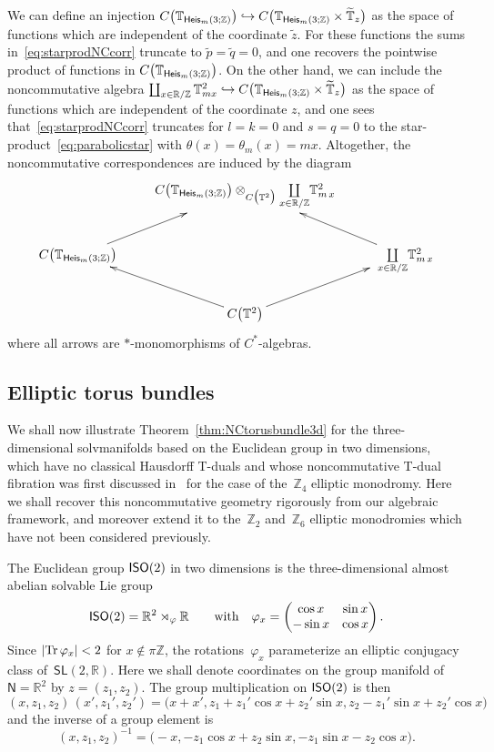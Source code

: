\documentclass[pdftex]{sigma}
\numberwithin{equation}{section}
\newcommand{\Z}{\zed}
\newcommand{\sfN}{\mathsf{N}}
\newcommand{\sfSL}{\mathsf{SL}}
\newcommand{\Heis}{{\sf Heis}}
\newcommand{\ISO}{{\sf ISO}}
\newcommand{\mcoprod}{\mbox{$\coprod\limits_{x\in\R/\Z}$}}
\newcommand{\R}{\real}
\newcommand{\zed}{{\mathbb Z}} %
\newcommand{\real}{{\mathbb R}} %
\newcommand{\torus}{{\mathbb T}} %
\newcommand{\Tr}[1]{{\rm Tr}\,#1}
\begin{document}
We can define an injection $C\big(\torus_{\Heis_m(3;\Z)}\big)\hookrightarrow
C\big(\torus_{\Heis_m(3;\Z)}\times\widetilde\torus_z\big)$ as the space of
functions which are independent of the coordinate $\tilde z$. For
these functions the sums in~\eqref{eq:starprodNCcorr} truncate to
$\tilde p=\tilde q=0$, and one recovers the pointwise product of
functions in $C\big(\torus_{\Heis_m(3;\Z)}\big)$. On the other hand, we can include the
noncommutative algebra $\coprod_{x\in\R/\Z} \torus_{m x}^2 \hookrightarrow
C\big(\torus_{\Heis_m(3;\Z)}\times\widetilde\torus_z\big)$ as the space of
functions which are independent of the coordinate $z$, and one sees
that~\eqref{eq:starprodNCcorr} truncates for $l=k=0$ and $s=q=0$ to the star-product~\eqref{eq:parabolicstar} with $\theta(x)=\theta_m(x)=m x$. Altogether, the noncommutative correspondences are
induced by the diagram
\[
\xymatrix{
& C\big(\torus_{\Heis_m(3;\Z)}\big)\otimes_{C\big(\torus^2\big)} \mcoprod \torus_{m\,x}^2 & \\
C\big(\torus_{\Heis_m(3;\Z)}\big) \ar[ur]& &
 \ \mcoprod \torus_{m\,x}^2
\ar[ul] \\
 & C\big(\torus^2\big) \ar[ur]
 \ar[ul] &
}
\]
where all arrows are $*$-monomorphisms of $C^*$-algebras.

\subsection{Elliptic torus bundles}\label{sec:ellipticbundles}

We shall now illustrate Theorem~\ref{thm:NCtorusbundle3d} for the three-dimensional solvmanifolds
based on the Euclidean group in two dimensions, which have no
classical Hausdorff T-duals and whose noncommutative T-dual fibration was first
discussed in~\cite{Hull2019} for the case of the~$\Z_4$ elliptic
monodromy. Here we shall recover this noncommutative geometry rigorously from
our algebraic framework, and moreover extend it to the~$\Z_2$ and~$\Z_6$ elliptic
monodromies which have not been considered previously.

The Euclidean group $\ISO(2)$ in two dimensions is the
three-dimensional almost abelian solvable Lie group
\begin{gather*}%
\ISO(2) = \real^2\rtimes_\varphi\real \qquad \mbox{with} \quad
\varphi_x = \left(
\begin{matrix}
\cos x & \sin x \\
-\sin x & \cos x
\end{matrix}
\right) .
\end{gather*}
Since $|\Tr\varphi_x|<2$ for $x\notin \pi \Z$, the rotations~$\varphi_x$
parameterize an elliptic conjugacy class of~$\sfSL(2,\real)$.
Here we shall denote coordinates on the group manifold of $\sfN=\real^2$ by
$z=(z_1,z_2)$. The group multiplication on $\ISO(2)$ is then
\[
(x,z_1,z_2)\,(x',z_1',z_2') = \big(x+x' ,
z_1+z_1' \cos x+z_2'\sin x ,
z_2-z_1' \sin x+z_2'\cos x\big)
\]
and the inverse of a group element is
\[
(x,z_1,z_2)^{-1} = \big({-}x , -z_1\cos x+z_2\sin x,
-z_1\sin x-z_2\cos x\big) .
\]
\end{document}
